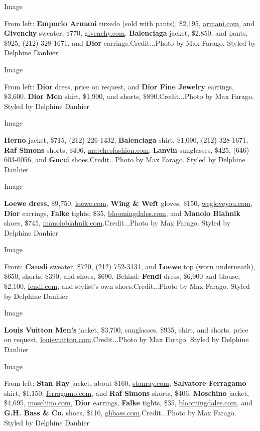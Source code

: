 Image

From left: \textbf{Emporio Armani} tuxedo (sold with pants), \$2,195,
\href{https://www.armani.com}{armani.com}, and \textbf{Givenchy}
sweater, \$770, \href{https://www.givenchy.com}{givenchy.com}.
\textbf{Balenciaga} jacket, \$2,850, and pants, \$925, (212) 328-1671,
and \textbf{Dior} earrings.Credit...Photo by Max Farago. Styled by
Delphine Danhier

Image

From left: \textbf{Dior} dress, price on request, and \textbf{Dior Fine
Jewelry} earrings, \$3,600. \textbf{Dior Men} shirt, \$1,900, and
shorts, \$890.Credit...Photo by Max Farago. Styled by Delphine Danhier

Image

\textbf{Herno} jacket, \$715, (212) 226-1432, \textbf{Balenciaga} shirt,
\$1,090, (212) 328-1671, \textbf{Raf Simons} shorts, \$406,
\href{https://www.matchesfashion.com}{matchesfashion.com},
\textbf{Lanvin} sunglasses, \$425, (646) 603-0056, and \textbf{Gucci}
shoes.Credit...Photo by Max Farago. Styled by Delphine Danhier

Image

\textbf{Loewe dress,} \$9,750, \href{http://loewe.com/}{loewe.com},
\textbf{Wing \& Weft} gloves, \$150,
\href{http://wegloveyou.com/}{wegloveyou.com}, \textbf{Dior} earrings,
\textbf{Falke} tights, \$35,
\href{http://bloomingdales.com/}{bloomingdales.com}, and \textbf{Manolo
Blahnik} shoes, \$745,
\href{http://www.manoloblahnik.com/}{manoloblahnik.com}.Credit...Photo
by Max Farago. Styled by Delphine Danhier

Image

Front: \textbf{Canali} sweater, \$720, (212) 752-3131, and
\textbf{Loewe} top (worn underneath), \$650, shorts, \$390, and shoes,
\$690. Behind: \textbf{Fendi} dress, \$6,900 and blouse, \$2,100,
\href{http://fendi.com/}{fendi.com}, and stylist's own
shoes.Credit...Photo by Max Farago. Styled by Delphine Danhier

Image

\textbf{Louis Vuitton Men's} jacket, \$3,700, sunglasses, \$935, shirt,
and shorts, price on request,
\href{https://www.louisvuitton.com/}{louisvuitton.com}.Credit...Photo by
Max Farago. Styled by Delphine Danhier

Image

From left: \textbf{Stan Ray} jacket, about \$160,
\href{https://www.stanray.com}{stanray.com}, \textbf{Salvatore
Ferragamo} shirt, \$1,150,
\href{https://www.ferragamo.com}{ferragamo.com}, and \textbf{Raf Simons}
shorts, \$406. \textbf{Moschino} jacket, \$4,695,
\href{https://www.moschino.com}{moschino.com}, \textbf{Dior} earrings,
\textbf{Falke} tights, \$35,
\href{https://www.bloomingdales.com}{bloomingdales.com}, and
\textbf{G.H. Bass \& Co.} shoes, \$110,
\href{https://www.ghbass.com}{ghbass.com}.Credit...Photo by Max Farago.
Styled by Delphine Danhier

